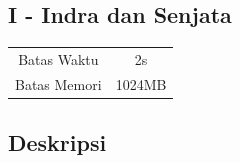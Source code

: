 \documentclass{article}
\begin{document}
\begin{center}
    \section*{I - Indra dan Senjata} %

    \begin{tabular}{ | c c | }
        \hline
        Batas Waktu  & 2s \\    %
        Batas Memori & 1024MB \\  %
        \hline
    \end{tabular}
\end{center}

\subsection*{Deskripsi}
\end{document}
